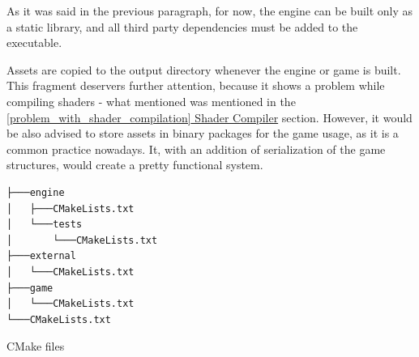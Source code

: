 As it was said in the previous paragraph, for now, the engine can be built only as a static library, and all third party dependencies must be added to the executable.

Assets are copied to the output directory whenever the engine or game is built. This fragment deservers further attention, because it shows a problem while compiling shaders - what mentioned was mentioned in the \hyperref[problem_with_shader_compilation]{\ref*{problem_with_shader_compilation} Shader Compiler} section. However, it would be also advised to store assets in binary packages for the game usage, as it is a common practice nowadays. It, with an addition of serialization of the game structures, would create a pretty functional system.

\begin{verbatim}
├───engine
│   ├───CMakeLists.txt
│   └───tests
│       └───CMakeLists.txt
├───external
│   └───CMakeLists.txt
├───game
│   └───CMakeLists.txt
└───CMakeLists.txt
\end{verbatim}
\begin{table}[h]
\caption{CMake files}
\end{table}
\newpage
